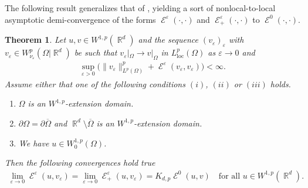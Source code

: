 \documentclass[12pt, reqno]{amsart}%
\theoremstyle{plain}  %
\newtheorem{theorem}{Theorem}[section]
\theoremstyle{definition}  %
\numberwithin{equation}{section}
\DeclareMathOperator{\loc}{loc}
\DeclareMathOperator{\cE}{\mathcal{E}}
\DeclareMathOperator{\R}{\mathbb{R}}
\newcommand{\eps}{\varepsilon}
\begin{document}
\noindent The following result generalizes that of
\cite[Lemma 2.8]{FeSa20}, yielding a sort of nonlocal-to-local asymptotic demi-convergence of the forms $\cE^\eps(\cdot,\cdot)$  and $\cE^\eps_+(\cdot,\cdot)$ to $\cE^0(\cdot,\cdot)$.
\begin{theorem} \label{thm:asymp-conv-form}
Let $u, v\in W^{1,p}(\R^d)$ and the sequence $ (v_\eps)_\eps$ with  $v_\eps \in W_{\nu_\eps}^p(\Omega|\R^d)$ be such that  $v_\eps|_\Omega \to v|_\Omega$ in $L^p_{\loc}(\Omega)$ as $\eps\to0$ and
\begin{align*}
\sup_{\eps>0} \big( \|v_\eps\|^p_{L^p(\Omega)}+ \cE^\eps(v_\eps, v_\eps)\big)<\infty.
\end{align*}
Assume either that one of the following conditions $(i)$,  $(ii)$ or $(iii)$ holds.
\begin{enumerate}[$(i)$]
\item $\Omega$ is an $W^{1,p}$-extension domain.
\item $\partial \Omega=\partial\overline{\Omega}$ and  $\R^d\setminus \overline{\Omega}$ is an $W^{1,p}$-extension domain.
\item We have $u\in W^{1,p}_0(\Omega)$.
\end{enumerate}
Then  the following convergences hold true
\begin{align*}
\lim_{\eps\to0}\cE^\eps(u, v_\eps) =\lim_{\eps\to0}\cE^\eps_+(u, v_\eps)
= K_{d,p} \cE^0(u, v)\quad\text{for all $u\in W^{1,p}(\R^d)$}.
\end{align*}
\end{theorem}
\end{document}
